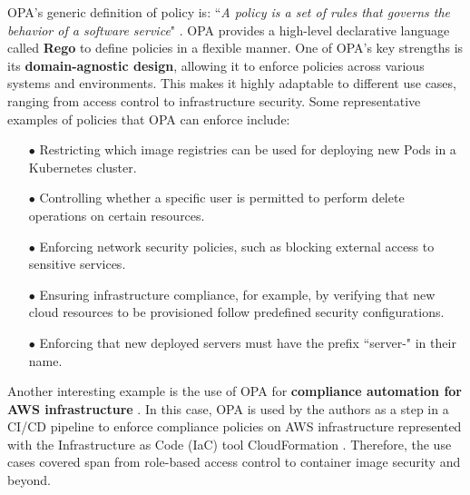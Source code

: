 OPA's generic definition of policy is: ``\textit{A policy is a set of rules that governs the behavior of a software service}" \cite{opa_philosophy}. OPA provides a high-level declarative language called \textbf{Rego} to define policies in a flexible manner. One of OPA's key strengths is its \textbf{domain-agnostic design}, allowing it to enforce policies across various systems and environments. This makes it highly adaptable to different use cases, ranging from access control to infrastructure security. Some representative examples of policies that OPA can enforce include:

\begin{itemize}[itemsep=0.2pt, topsep=1pt] \item[$\bullet$] Restricting which image registries can be used for deploying new Pods in a Kubernetes cluster.
\item[$\bullet$] Controlling whether a specific user is permitted to perform delete operations on certain resources.
\item[$\bullet$] Enforcing network security policies, such as blocking external access to sensitive services.
\item[$\bullet$] Ensuring infrastructure compliance, for example, by verifying that new cloud resources to be provisioned follow predefined security configurations.
\item[$\bullet$] Enforcing that new deployed servers must have the prefix ``server-" in their name.
\end{itemize}

Another interesting example is the use of OPA for \textbf{compliance automation for AWS infrastructure} \cite{10612535}. 
In this case, OPA is used by the authors as a step in a CI/CD pipeline to enforce compliance policies on AWS infrastructure represented with the Infrastructure as Code (IaC) tool CloudFormation \cite{10612535}.
Therefore, the use cases covered span from role-based access control to container image security and beyond.
\newline

